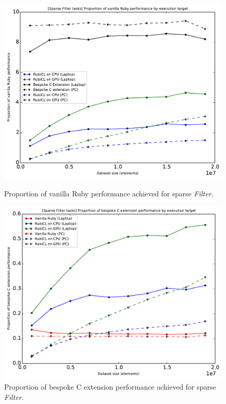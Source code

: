 \begin{figure}[H]
\end{figure}

\begin{figure}[H]
  \centering
  \includegraphics[width=\textwidth]{./graphing/sparse_filter/prop_van.pdf}
  \caption{Proportion of vanilla Ruby performance achieved for sparse \emph{Filter}.}
  \label{fig:sfilter_task_vperf_g}

  \includegraphics[width=\textwidth]{./graphing/sparse_filter/prop_bes.pdf}
  \caption{Proportion of bespoke C extension performance achieved for sparse \emph{Filter}.}
  \label{fig:sfilter_task_bperf_g}
\end{figure}
